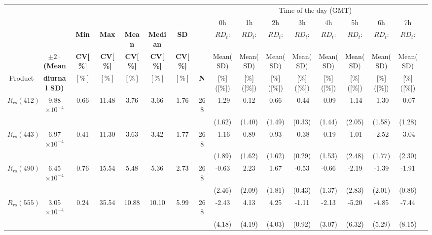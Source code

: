 \documentclass[preview]{standalone}
\begin{document}
\scriptsize
\centering
\setlength\tabcolsep{1.5pt} %
\begin{tabular}{ccccccccccccccccc} \hline
 &&&&&&  &  &   \multicolumn{8}{c}{Time of the day (GMT)} &   \\ \cline{9-16}
 &&&&&& &  &    0h    & 1h  &  2h  &  3h  &  4h  &  5h  &  6h   &  7h &   \\ 
   &  & \bfseries{Min} & \bfseries{Max} & \bfseries{Mean} & \bfseries{Median} & \bfseries{SD} &  &    $RD_t$:    & $RD_t$:  &  $RD_t$:  &  $RD_t$:  &  $RD_t$:  &  $RD_t$:  &  $RD_t$:   &  $RD_t$:  \\ 
   & \bfseries{$\pm2\cdot$(Mean} & \bfseries{CV[\%]} & \bfseries{CV[\%]} & \bfseries{CV[\%]} & \bfseries{CV[\%]} & \bfseries{CV[\%]} &  &    Mean(SD)    & Mean(SD)  &  Mean(SD)  &  Mean(SD)  &  Mean(SD)  &  Mean(SD)  &  Mean(SD)   &  Mean(SD) &  \\ 
Product  & \bfseries{diurnal SD)}  & $[\%]$ & $[\%]$ & $[\%]$ & $[\%]$ & $[\%]$  & \bfseries{N} &    [\%]([\%])    & [\%]([\%])  &  [\%]([\%])  &  [\%]([\%])  &  [\%]([\%])  &  [\%]([\%])  &  [\%]([\%])   &  [\%]([\%])   \\ \hline \hline
$R_{rs}(412)$ 	& 9.88$\times10^{-4}$ 	& 0.66 	&  11.48 	&    3.76 	&	 3.66 	&   1.76 	& 	268 	&  -1.29 	&  0.12 	& 0.66 		&-0.44 		& -0.09 	& -1.14 	& -1.30  	& -0.07  	\\
 				&						&		&			&			&			&			&			& (1.62) 	& (1.40) 	& (1.49) 	& (0.33) 	& (1.44) 	& (2.05) 	& (1.58) 	& (1.28) 	\\ \hline
$R_{rs}(443)$ 	& 6.97$\times10^{-4}$ 	& 0.41 	&  11.30 	&    3.63 	&	 3.42 	&   1.77 	& 	268 	&  -1.16 	&  0.89  	& 0.93  	&-0.38   	& -0.19  	&  -1.01   	& -2.52   	& -3.04  	\\ 
 				&						&		&			&			&			&			&			& (1.89) 	& (1.62) 	& (1.62) 	& (0.29) 	& (1.53) 	& (2.48) 	& (1.77) 	& (2.30) 	\\ \hline
$R_{rs}(490)$ 	& 6.45$\times10^{-4}$ 	& 0.76 	&  15.54 	&    5.48 	&	 5.36 	&   2.73 	& 	268 	& -0.63   	& 2.23   	&  1.67 	& -0.53  	& -0.66   	&  -2.19   	& -1.39   	& -1.91  	\\
 				&						&		&			&			&			&			&			& (2.46) 	& (2.09) 	& (1.81) 	& (0.43) 	& (1.37) 	& (2.83) 	& (2.01) 	& (0.86) 	\\ \hline   
$R_{rs}(555)$ 	& 3.05$\times10^{-4}$ 	& 0.24 	&  35.54 	&  10.88 	&	10.10 	&   5.99 	& 	268 	& -2.43   	& 4.13   	&  4.25 	& -1.11  	& -2.13   	&  -5.20   	& -4.85   	& -7.44  	\\
 				&						&		&			&			&			&			&			& (4.18) 	& (4.19) 	& (4.03) 	& (0.92) 	& (3.07) 	& (6.32) 	& (5.29) 	& (8.15) 	\\ \hline   

\end{tabular}
\end{document}
